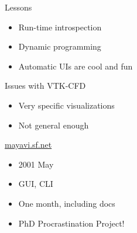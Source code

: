 \begin{frame}{Lessons}
    \Large
    \begin{center}
        \begin{itemize}
            \item Run-time introspection
            \item Dynamic programming
            \item Automatic UIs are cool and fun
        \end{itemize}
    \end{center}
\end{frame}

\begin{frame}{Issues with VTK-CFD}
    \Large
    \begin{center}
        \begin{itemize}
            \item Very specific visualizations
            \item Not general enough
        \end{itemize}
    \end{center}
\end{frame}

\begin{frame}
\Huge
\begin{center}
    \vspace*{1in}
    \url{mayavi.sf.net}
\end{center}
\end{frame}

\begin{frame}[plain]
\end{frame}

\begin{frame}[plain]
\end{frame}

\begin{frame}
    \Large
    \begin{itemize}
        \item 2001 May
        \item GUI, CLI
        \item One month, including docs
        \item PhD Procrastination Project!
    \end{itemize}
\end{frame}

